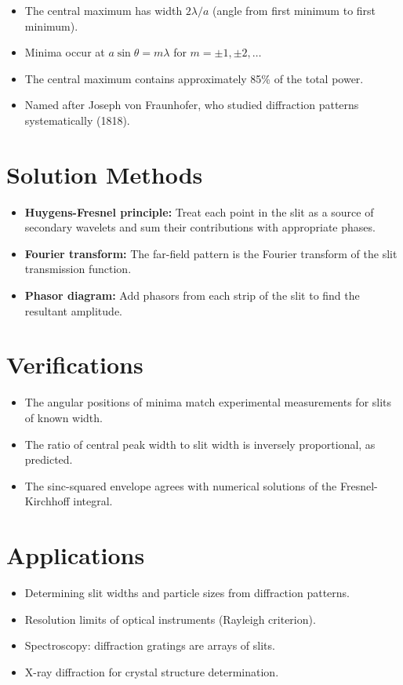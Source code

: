\documentclass[11pt,openright]{book}
\begin{document}
\begin{itemize}
    \item The central maximum has width $2\lambda/a$ (angle from first minimum to first minimum).
    \item Minima occur at $a\sin\theta = m\lambda$ for $m = \pm 1, \pm 2, \ldots$
    \item The central maximum contains approximately 85\% of the total power.
    \item Named after Joseph von Fraunhofer, who studied diffraction patterns systematically (1818).
\end{itemize}
\section*{Solution Methods}

\begin{itemize}
    \item \textbf{Huygens-Fresnel principle:} Treat each point in the slit as a source of secondary wavelets and sum their contributions with appropriate phases.
    \item \textbf{Fourier transform:} The far-field pattern is the Fourier transform of the slit transmission function.
    \item \textbf{Phasor diagram:} Add phasors from each strip of the slit to find the resultant amplitude.
\end{itemize}
\section*{Verifications}

\begin{itemize}
    \item The angular positions of minima match experimental measurements for slits of known width.
    \item The ratio of central peak width to slit width is inversely proportional, as predicted.
    \item The sinc-squared envelope agrees with numerical solutions of the Fresnel-Kirchhoff integral.
\end{itemize}
\section*{Applications}

\begin{itemize}
    \item Determining slit widths and particle sizes from diffraction patterns.
    \item Resolution limits of optical instruments (Rayleigh criterion).
    \item Spectroscopy: diffraction gratings are arrays of slits.
    \item X-ray diffraction for crystal structure determination.
\end{itemize}
\end{document}
